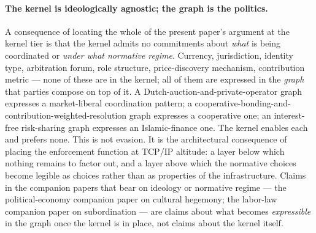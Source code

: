 \documentclass[11pt,a4paper]{article}
\theoremstyle{definition}
\theoremstyle{remark}
\begin{document}
\paragraph{The kernel is ideologically agnostic; the graph is the
politics.} A consequence of locating the whole of the present
paper's argument at the kernel tier is that the kernel admits no
commitments about \emph{what} is being coordinated or \emph{under
what normative regime}. Currency, jurisdiction, identity type,
arbitration forum, role structure, price-discovery mechanism,
contribution metric --- none of these are in the kernel; all of
them are expressed in the \emph{graph} that parties compose on top
of it. A Dutch-auction-and-private-operator graph expresses a
market-liberal coordination pattern; a
cooperative-bonding-and-contribution-weighted-resolution graph
expresses a cooperative one; an interest-free risk-sharing graph
expresses an Islamic-finance one. The kernel enables each and
prefers none. This is not evasion. It is the architectural
consequence of placing the enforcement function at TCP/IP altitude:
a layer below which nothing remains to factor out, and a layer
above which the normative choices become legible as choices rather
than as properties of the infrastructure. Claims in the companion
papers that bear on ideology or normative regime --- the
political-economy companion paper on cultural
hegemony; the labor-law companion paper on
subordination --- are claims about what becomes \emph{expressible}
in the graph once the kernel is in place, not claims about the
kernel itself.
\end{document}
